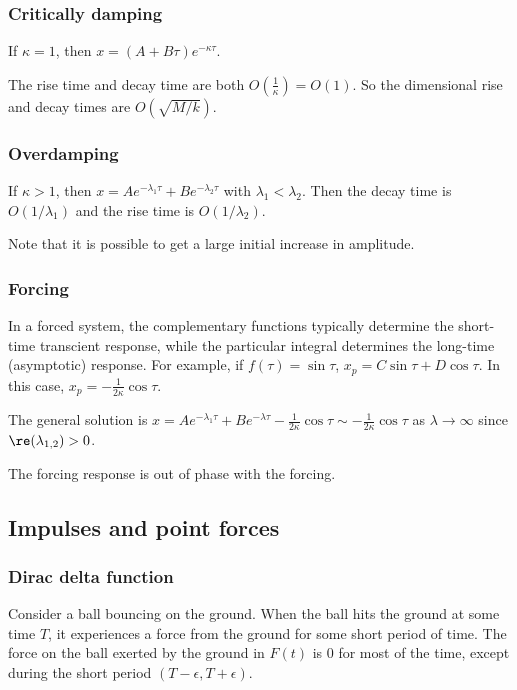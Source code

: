 \documentclass[a4paper]{article}
\begin{document}
\subsubsection{Critically damping}
If $\kappa = 1$, then $x = (A + B\tau)e^{-\kappa\tau}$.

The rise time and decay time are both $O(\frac{1}{\kappa}) = O(1)$. So the dimensional rise and decay times are $O(\sqrt{M/k})$.

\newpage %

\subsubsection{Overdamping}
If $\kappa > 1$, then $x = Ae^{-\lambda_1\tau} + Be^{-\lambda_2\tau}$ with $\lambda_1 < \lambda_2$. Then the decay time is $O(1/\lambda_1)$ and the rise time is $O(1/\lambda_2)$.

Note that it is possible to get a large initial increase in amplitude.

\subsubsection{Forcing}
In a forced system, the complementary functions typically determine the short-time transcient response, while the particular integral determines the long-time (asymptotic) response.
For example, if $f(\tau) = \sin\tau$, $x_p = C\sin \tau + D\cos\tau$. In this case, $x_p = -\frac{1}{2\kappa}\cos\tau$.

The general solution is $x = Ae^{-\lambda_1\tau} + Be^{-\lambda \tau} - \frac{1}{2\kappa}\cos\tau \sim -\frac{1}{2\kappa}\cos\tau$ as $\lambda\to \infty$ since $\re (\lambda_{1, 2}) > 0$.

\note The forcing response is out of phase with the forcing.
\subsection{Impulses and point forces}
\subsubsection{Dirac delta function}
Consider a ball bouncing on the ground. When the ball hits the ground at some time $T$, it experiences a force from the ground for some short period of time. The force on the ball exerted by the ground in $F(t)$ is $0$ for most of the time, except during the short period $(T - \epsilon, T + \epsilon)$.
\end{document}
